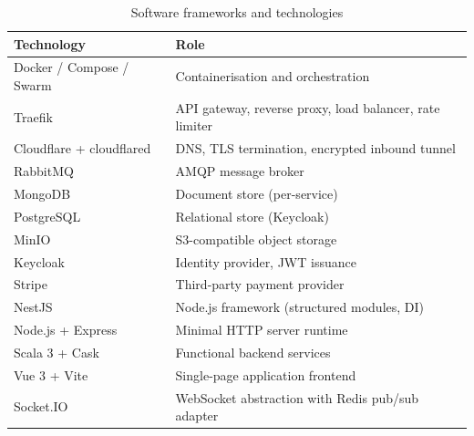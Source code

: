 \begin{table}[H]
  \centering
  \begin{tabular}{ll}
    \toprule
    \textbf{Technology} & \textbf{Role} \\
    \midrule
    Docker / Compose / Swarm & Containerisation and orchestration \\
    Traefik & API gateway, reverse proxy, load balancer, rate limiter \\
    Cloudflare + cloudflared & DNS, TLS termination, encrypted inbound tunnel \\
    RabbitMQ & AMQP message broker \\
    MongoDB & Document store (per-service) \\
    PostgreSQL & Relational store (Keycloak) \\
    MinIO & S3-compatible object storage \\
    Keycloak & Identity provider, JWT issuance \\
    Stripe & Third-party payment provider \\
    NestJS & Node.js framework (structured modules, DI) \\
    Node.js + Express & Minimal HTTP server runtime \\
    Scala 3 + Cask & Functional backend services \\
    Vue 3 + Vite & Single-page application frontend \\
    Socket.IO & WebSocket abstraction with Redis pub/sub adapter \\
    \bottomrule
  \end{tabular}
  \caption{Software frameworks and technologies}
  \label{tab:technologies}
\end{table}
